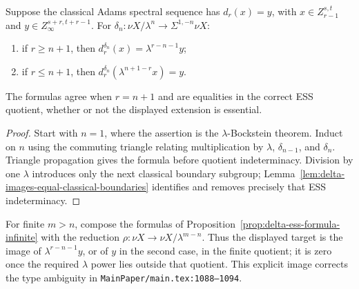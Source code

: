 \begin{proposition}
  \label{prop:delta-ess-formula-infinite}
  \notready
  Suppose the classical Adams spectral sequence has
  $d_r(x)=y$, with $x\in Z_{r-1}^{s,t}$ and
  $y\in Z_\infty^{s+r,t+r-1}$.  For
  $\delta_n:\nu X/\lambda^n\to\Sigma^{1,-n}\nu X$:
  \begin{enumerate}
    \item if $r\ge n+1$, then
      $d_r^{\delta_n}(x)=\lambda^{r-n-1}y$;
    \item if $r\le n+1$, then
      $d_r^{\delta_n}(\lambda^{n+1-r}x)=y$.
  \end{enumerate}
  The formulas agree when $r=n+1$ and are equalities in the correct ESS
  quotient, whether or not the displayed extension is essential.
\end{proposition}

\begin{proof}
  Start with $n=1$, where the assertion is the $\lambda$-Bockstein theorem.
  Induct on $n$ using the commuting triangle relating multiplication by
  $\lambda$, $\delta_{n-1}$, and $\delta_n$.  Triangle propagation gives the
  formula before quotient indeterminacy.  Division by one $\lambda$ introduces
  only the next classical boundary subgroup; Lemma~\ref{lem:delta-images-equal-classical-boundaries}
  identifies and removes precisely that ESS indeterminacy.
\end{proof}

\begin{proposition}
  \label{prop:delta-ess-formula-finite}
  \notready
  For finite $m>n$, compose the formulas of
  Proposition~\ref{prop:delta-ess-formula-infinite} with the reduction
  $\rho:\nu X\to\nu X/\lambda^{m-n}$.  Thus the displayed target is the image
  of $\lambda^{r-n-1}y$, or of $y$ in the second case, in the finite quotient;
  it is zero once the required $\lambda$ power lies outside that quotient.
  This explicit image corrects the type ambiguity in
  \texttt{MainPaper/main.tex:1088--1094}.
\end{proposition}

